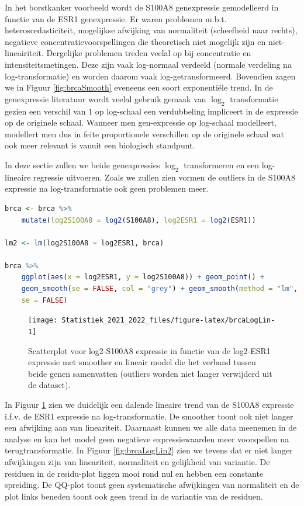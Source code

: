 \documentclass[
  12pt,dutch,coursenotes]{book}
\theoremstyle{definition}
\theoremstyle{definition}
\theoremstyle{definition}
\theoremstyle{definition}
\theoremstyle{remark}
\begin{document}
In het borstkanker voorbeeld wordt de S100A8 genexpressie gemodelleerd in functie van de ESR1 genexpressie. Er waren problemen m.b.t. heteroscedasticiteit, mogelijkse afwijking van normaliteit (scheefheid naar rechts), negatieve concentratievoorspellingen die theoretisch niet mogelijk zijn en niet-lineairiteit. Dergelijke problemen treden veelal op bij concentratie en intensiteitsmetingen. Deze zijn vaak log-normaal verdeeld (normale verdeling na log-transformatie) en worden daarom vaak log-getransformeerd.
Bovendien zagen we in Figuur \ref{fig:brcaSmooth} eveneens een soort exponentiële trend.
In de genexpressie literatuur wordt veelal gebruik gemaak van \(\log_2\) transformatie gezien een verschil van 1 op log-schaal een verdubbeling impliceert in de expressie op de originele schaal.
Wanneer men gen-expressie op log-schaal modelleert, modellert men dus in feite proportionele verschillen op de originele schaal wat ook meer relevant is vanuit een biologisch standpunt.

In deze sectie zullen we beide genexpressies \(\log_2\) transformeren en een log-lineaire regressie uitvoeren. Zoals we zullen zien vormen de outliers in de S100A8 expressie na log-transformatie ook geen problemen meer.

\begin{lstlisting}[language=R]
brca <- brca %>%
    mutate(log2S100A8 = log2(S100A8), log2ESR1 = log2(ESR1))

lm2 <- lm(log2S100A8 ~ log2ESR1, brca)

brca %>%
    ggplot(aes(x = log2ESR1, y = log2S100A8)) + geom_point() +
    geom_smooth(se = FALSE, col = "grey") + geom_smooth(method = "lm",
    se = FALSE)
\end{lstlisting}

\begin{figure}

{\centering \texttt{[image: Statistiek\_2021\_2022\_files/figure-latex/brcaLogLin-1]} 

}

\caption{Scatterplot voor log2-S100A8 expressie in functie van de log2-ESR1 expressie met smoother en lineair model die het verband tussen beide genen samenvatten (outliers worden niet langer verwijderd uit de dataset).}\label{fig:brcaLogLin}
\end{figure}

In Figuur \ref{fig:brcaLogLin} zien we duidelijk een dalende lineaire trend van de S100A8 expressie i.f.v. de ESR1 expressie na log-transformatie.
De smoother toont ook niet langer een afwijking aan van lineariteit.
Daarnaast kunnen we alle data meenemen in de analyse en kan het model geen negatieve expressiewaarden meer voorspellen na terugtransformatie.
In Figuur \ref{fig:brcaLogLin2} zien we tevens dat er niet langer afwijkingen zijn van lineariteit, normaliteit en gelijkheid van variantie.
De residuen in de residu-plot liggen mooi rond nul en hebben een constante spreiding.
De QQ-plot toont geen systematische afwijkingen van normaliteit en de plot links beneden toont ook geen trend in de variantie van de residuen.
\end{document}
